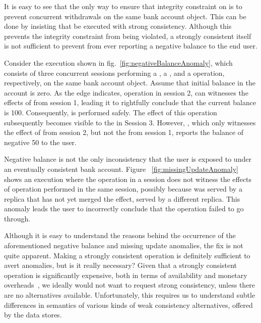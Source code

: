 It is easy to see that the only way to ensure that integrity constraint on
 is to prevent concurrent withdrawals on the same bank account
object. This can be done by insisting that  be executed with
strong consistency. Although this prevents the integrity constraint from being
violated, a strongly consistent  itself is not sufficient to
prevent  from ever reporting a negative balance to the end user.

Consider the execution shown in fig.~\ref{fig:negativeBalanceAnomaly}, which
consists of three concurrent sessions performing a , a
, and a  operation, respectively, on the same bank
account object. Assume that initial balance in the account is zero. As the
 edge indicates, operation  in session 2, can
witnesses the effects of  from session 1, leading it to
rightfully conclude that the current balance is 100. Consequently,
 is performed safely. The effect of this 
operation subsequently becomes visible to the  in Session 3.
However, , which only witnesses the effect of  from
session 2, but not the  from session 1, reports the balance of
negative 50 to the user.

Negative balance is not the only inconsistency that the user is exposed to
under an eventually consistent bank account. Figure
~\ref{fig:missingUpdateAnomaly} shows an execution where the 
operation in a session does not witness the effects of  operation
performed in the same session, possibly because  was served by a
replica that has not yet merged the  effect, served by a different
replica. This anomaly leads the user to incorrectly conclude that the
 operation failed to go through.

Although it is easy to understand the reasons behind the occurrence of the
aforementioned negative balance and missing update anomalies, the fix is not
quite apparent. Making  a strongly consistent operation is
definitely sufficient to avert anomalies, but is it really necessary? Given
that a strongly consistent operation is significantly expensive, both in terms
of availability and monetary overheads~\cite{DynamoDB,Pileus}, we ideally would
not want to request strong consistency, unless there are no alternatives
available. Unfortunately, this requires us to understand subtle differences in
semantics of various kinds of weak consistency alternatives, offered by the
data stores.

